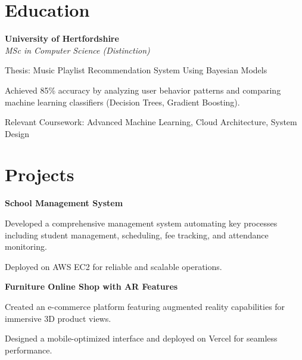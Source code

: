 \documentclass[letterpaper,10pt]{article}
\newcommand{\heading}[2]{
  \hspace{10pt}#1\hfill#2\\
}
\newcommand{\headingBf}[2]{
  \heading{\textbf{#1}}{\textbf{#2}}
}
\newcommand{\headingIt}[2]{
  \heading{\textit{#1}}{\textit{#2}}
}
\newenvironment{resume_list}{
  \vspace{-7pt}
  \begin{itemize}[itemsep=-2px, parsep=1pt, leftmargin=30pt]
}{
  \end{itemize}
}
\begin{document}

  \section{Education}

  \headingBf{University of Hertfordshire}{}
  \headingIt{MSc in Computer Science (Distinction)}{}
  \begin{resume_list}
    \item Thesis: Music Playlist Recommendation System Using Bayesian Models
    \item Achieved 85\% accuracy by analyzing user behavior patterns and comparing machine learning classifiers (Decision Trees, Gradient Boosting).
    \item Relevant Coursework: Advanced Machine Learning, Cloud Architecture, System Design
  \end{resume_list}


  \section{Projects}

  \headingBf{School Management System}{}
  \begin{resume_list}
    \item Developed a comprehensive management system automating key processes including student management, scheduling, fee tracking, and attendance monitoring.
    \item Deployed on AWS EC2 for reliable and scalable operations.
  \end{resume_list}

  \headingBf{Furniture Online Shop with AR Features}{}
  \begin{resume_list}
    \item Created an e-commerce platform featuring augmented reality capabilities for immersive 3D product views.
    \item Designed a mobile-optimized interface and deployed on Vercel for seamless performance.
  \end{resume_list}
\end{document}
